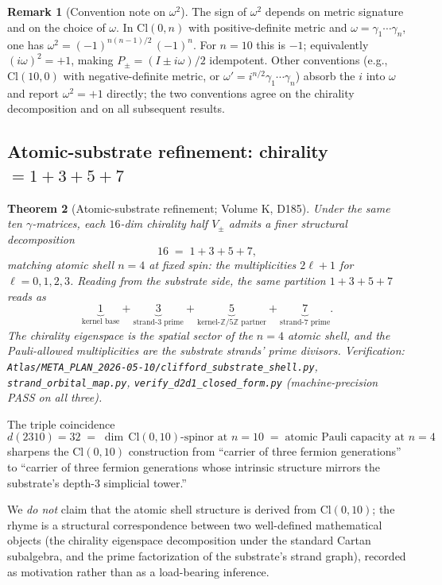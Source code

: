 \documentclass[11pt,reqno]{amsart}
\newtheorem{theorem}{Theorem}[section]
\theoremstyle{definition}
\newtheorem{remark}[theorem]{Remark}
\newcommand{\Z}{\mathbb{Z}}
\newcommand{\Cl}{\mathrm{Cl}}
\begin{document}
\begin{remark}[Convention note on $\omega^2$]
\label{rem:omega-sign}
The sign of $\omega^2$ depends on metric signature and on the choice
of $\omega$. In $\Cl(0, n)$ with positive-definite metric and
$\omega = \gamma_1 \cdots \gamma_n$, one has $\omega^2 = (-1)^{n(n-1)/2}\,
(-1)^n$. For $n = 10$ this is $-1$; equivalently $(i\omega)^2 = +1$,
making $P_\pm = (I \pm i\omega)/2$ idempotent. Other conventions
(e.g., $\Cl(10, 0)$ with negative-definite metric, or
$\omega' = i^{n/2} \gamma_1 \cdots \gamma_n$) absorb the $i$ into
$\omega$ and report $\omega^2 = +1$ directly; the two conventions
agree on the chirality decomposition and on all subsequent results.
\end{remark}

\subsection{Atomic-substrate refinement: chirality $= 1 + 3 + 5 + 7$}
\label{sec:atomic}

\begin{theorem}[Atomic-substrate refinement; Volume K, D185]
\label{thm:atomic-shell}
Under the same ten $\gamma$-matrices, each $16$-dim chirality half
$V_\pm$ admits a finer structural decomposition
\[
  16 \;=\; 1 + 3 + 5 + 7,
\]
matching atomic shell $n = 4$ at fixed spin: the multiplicities
$2\ell+1$ for $\ell = 0, 1, 2, 3$. Reading from the substrate side,
the same partition $1 + 3 + 5 + 7$ reads as
\[
  \underbrace{1}_{\text{kernel base}}
  + \underbrace{3}_{\text{strand-$3$ prime}}
  + \underbrace{5}_{\text{kernel-$\Z/5\Z$ partner}}
  + \underbrace{7}_{\text{strand-$7$ prime}}.
\]
The chirality eigenspace is the spatial sector of the $n = 4$
atomic shell, and the Pauli-allowed multiplicities are the
substrate strands' prime divisors. Verification:
\texttt{Atlas/META\_PLAN\_2026-05-10/clifford\_substrate\_shell.py},
\texttt{strand\_orbital\_map.py},
\texttt{verify\_d2d1\_closed\_form.py}
\cite{Sanders2026VolumeK} (machine-precision PASS on all three).
\end{theorem}

The triple coincidence
\[
  d(2310) = 32 \;=\; \dim\, \Cl(0, 10)\text{-spinor at }n = 10
       \;=\; \text{atomic Pauli capacity at }n = 4
\]
sharpens the $\Cl(0, 10)$ construction from ``carrier of three
fermion generations'' to ``carrier of three fermion generations
whose intrinsic structure mirrors the substrate's depth-$3$
simplicial tower.''

We \emph{do not} claim that the atomic shell structure is derived
from $\Cl(0, 10)$; the rhyme is a structural correspondence between
two well-defined mathematical objects (the chirality eigenspace
decomposition under the standard Cartan subalgebra, and the prime
factorization of the substrate's strand graph), recorded as
motivation rather than as a load-bearing inference.
\end{document}
